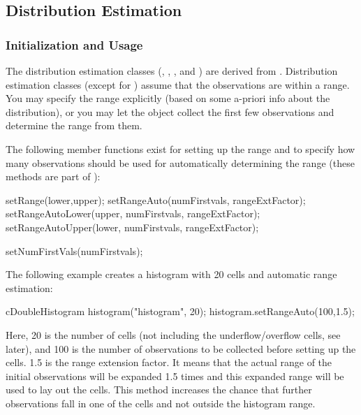 \subsection{Distribution Estimation}

\subsubsection{Initialization and Usage}


The distribution estimation classes
(, , ,
 and ) are derived from
. Distribution estimation classes (except for
) assume that the observations are within a range.
You may specify the range explicitly (based on some a-priori info
about the distribution), or you may let the object collect the first
few observations and determine the range from them.

The following member functions exist for setting up the range
and to specify how many observations should be used for automatically
determining the range (these methods are part of ):

\begin{cpp}
setRange(lower,upper);
setRangeAuto(numFirstvals, rangeExtFactor);
setRangeAutoLower(upper, numFirstvals, rangeExtFactor);
setRangeAutoUpper(lower, numFirstvals, rangeExtFactor);
\end{cpp}

\begin{cpp}
setNumFirstVals(numFirstvals);
\end{cpp}

The following example creates a histogram with 20 cells and automatic
range estimation:

\begin{cpp}
cDoubleHistogram histogram("histogram", 20);
histogram.setRangeAuto(100,1.5);
\end{cpp}


Here, 20 is the number of cells (not including the underflow/overflow
cells, see later), and 100 is the number of observations to be
collected before setting up the cells. 1.5 is the range extension
factor. It means that the actual range of the initial observations
will be expanded 1.5 times and this expanded range will be used to lay
out the cells. This method increases the chance that further
observations fall in one of the cells and not outside the histogram
range.

